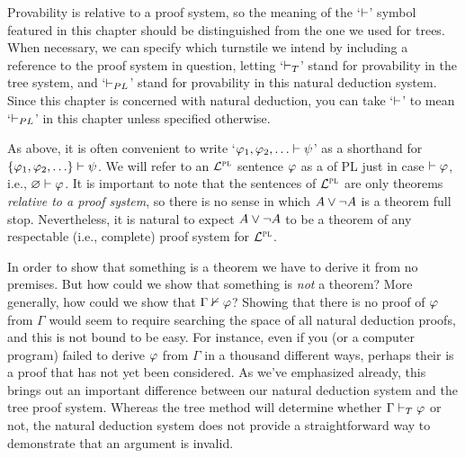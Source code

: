 Provability is relative to a proof system, so the meaning of the `$\vdash$' symbol featured in this chapter should be distinguished from the one we used for trees.
When necessary, we can specify which turnstile we intend by including a reference to the proof system in question, letting `$\vdash_{T}$' stand for provability in the tree system, and `$\vdash_{PL}$' stand for provability in this natural deduction system.
Since this chapter is concerned with natural deduction, you can take `$\vdash$' to mean `$\vdash_{PL}$' in this chapter unless specified otherwise.

As above, it is often convenient to write `$\varphi_1,\varphi_2,\ldots\vdash\psi$' as a shorthand for $\lbrace\varphi_1,\varphi_2,\ldots\rbrace\vdash\psi$.
We will refer to an $\mathcal{L}^{\textsc{pl}}$ sentence $\varphi$ as a  of PL just in case $\vdash\varphi$, i.e., $\varnothing\vdash\varphi$.
It is important to note that the sentences of $\mathcal{L}^{\textsc{pl}}$ are only theorems \textit{relative to a proof system}, so there is no sense in which $A\vee\neg A$ is a theorem full stop.
Nevertheless, it is natural to expect $A\vee\neg A$ to be a theorem of any respectable (i.e., complete) proof system for $\mathcal{L}^{\textsc{pl}}$.

In order to show that something is a theorem we have to derive it from no premises.
But how could we show that something is \emph{not} a theorem?
More generally, how could we show that $\Gamma \nvdash \varphi$?
Showing that there is no proof of $\varphi$ from $\Gamma$ would seem to require searching the space of all natural deduction proofs, and this is not bound to be easy. 
For instance, even if you (or a computer program) failed to derive $\varphi$ from $\Gamma$ in a thousand different ways, perhaps their is a proof that has not yet been considered.
As we've emphasized already, this brings out an important difference between our natural deduction system and the tree proof system.
Whereas the tree method will determine whether $\Gamma \vdash_{T} \varphi$ or not, the natural deduction system does not provide a straightforward way to demonstrate that an argument is invalid.






